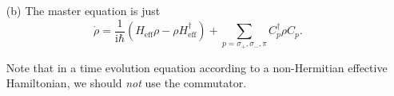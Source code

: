 \documentclass[hyperref, a4paper]{article}
\newcommand*{\ii}{\mathrm{i}}
\begin{document}
\begin{itemize}
\item[(b)] The master equation is just 
\begin{equation}
    \dot{\rho} = \frac{1}{\ii \hbar} ( H_\text{eff} \rho - \rho H_\text{eff}^\dagger ) + \sum_{p = \sigma_+, \sigma_-, \pi} C^\dagger_p \rho C_p.
\end{equation}

\begin{note*}{}{}
    Note that in a time evolution equation according to a non-Hermitian effective Hamiltonian, we should
    \emph{not} use the commutator.
\end{note*}

\end{itemize}
\end{document}
